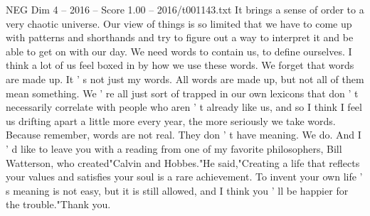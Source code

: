 \begin{textsample}{NEG Dim 4 – 2016 – Score 1.00 – 2016/t001143.txt}
It brings a sense of order to a very chaotic universe.
Our view of things is so limited that we have to come up with patterns and shorthands and try to figure out a way to interpret it and be able to get on with our day.
We need words to contain us, to define ourselves.
I think a lot of us feel boxed in by how we use these words.
We forget that words are made up.
It ' s not just my words.
All words are made up, but not all of them mean something.
We ' re all just sort of trapped in our own lexicons that don ' t necessarily correlate with people who aren ' t already like us, and so I think I feel us drifting apart a little more every year, the more seriously we take words.
Because remember, words are not real.
They don ' t have meaning.
We do.
And I ' d like to leave you with a reading from one of my favorite philosophers, Bill Watterson, who created"Calvin and Hobbes."He said,"Creating a life that reflects your values and satisfies your soul is a rare achievement.
To invent your own life ' s meaning is not easy, but it is still allowed, and I think you ' ll be happier for the trouble."Thank you.

\end{textsample}
